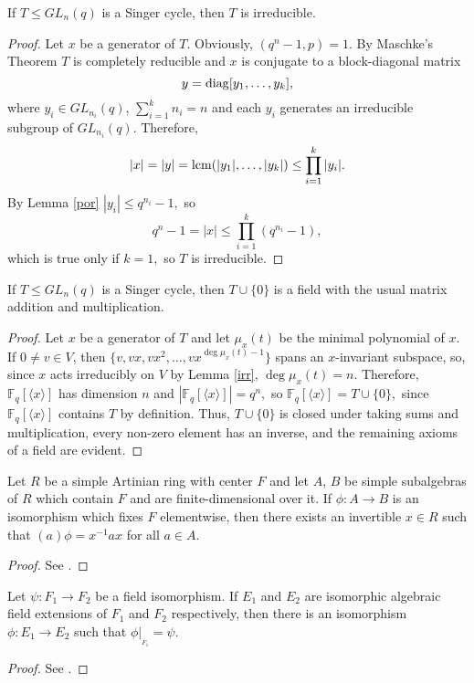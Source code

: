 \begin{Lem}\label{irr}
If $T \le GL_n(q)$ is a Singer cycle, then $T$ is irreducible.
\end{Lem}
\begin{proof}
Let $x$ be a generator of $T$. Obviously, $(q^n-1,p)=1$. By Maschke's Theorem $T$ is completely reducible and $x$ is conjugate to a block-diagonal matrix $$y=\mathrm{diag} [y_1, \ldots, y_k],$$
where $y_i \in GL_{n_i}(q)$, $\sum_{i=1}^k n_{i}=n$ and each $y_i$ generates an irreducible subgroup of $GL_{n_i}(q)$. Therefore, $$|x|=|y|={\rm lcm}(|y_1|, \ldots, |y_k|)\le \prod_{i=1}^k|y_i|.$$
By Lemma \ref{por} $|y_i| \le q^{n_i}-1,$ so  
$$q^n-1=|x|\le \prod_{i=1}^k (q^{n_i}-1),$$
which is true only if $k=1,$ so $T$ is irreducible.
\end{proof}


\begin{Lem}\label{field}
If $T \le GL_n(q)$ is a Singer cycle, then $T \cup \{0\}$  is a field with the usual matrix addition and multiplication.
\end{Lem}
\begin{proof}
Let $x$ be a generator of $T$ and let $\mu_x(t)$ be the minimal polynomial of $x.$ If $0 \ne v \in V$, then $\{v,vx,vx^2, \ldots, vx^{\deg{\mu_x(t)}-1}\}$ spans an $x$-invariant subspace, so, since $x$ acts irreducibly on $V$ by Lemma \ref{irr},  $\deg{\mu_x(t)}=n.$ Therefore, $\mathbb{F}_q[\langle x \rangle]$ has dimension $n$ and $|\mathbb{F}_q[\langle x \rangle]|=q^n,$ so $\mathbb{F}_q[\langle x \rangle]=T \cup \{0\},$ since $\mathbb{F}_q[\langle x \rangle]$ contains $T$ by definition. Thus, $T \cup \{0\}$ is closed under taking sums and multiplication, every non-zero element has an inverse, and the remaining axioms of a field are evident.      
\end{proof}



\begin{Th}
Let $R$ be a simple Artinian ring with center $F$ and let $A$, $B$ be simple subalgebras of $R$ which contain $F$ and are finite-dimensional over it. If $\phi: A \to B$ is an isomorphism  which fixes $F$ elementwise,  then there exists an invertible $x \in R$ such that $(a)\phi=x^{-1}ax$ for all $a \in A.$
\end{Th}
\begin{proof}
See \cite[Chapter 4]{herst}.  
\end{proof}  



\begin{Th}
\label{isoextth}
Let $ \psi :{F}_1 \to {F}_2$ be a field isomorphism. If $E_1$ and $E_2$ are isomorphic algebraic field extensions of $F_1$ and $F_2$ respectively, then there is an isomorphism $\phi : E_1 \to E_2$ such that $\phi |_{_{F_1}}=\psi.$ 
\end{Th}
\begin{proof}
See \cite[Theorem 3.20]{extth}.  
\end{proof}  

